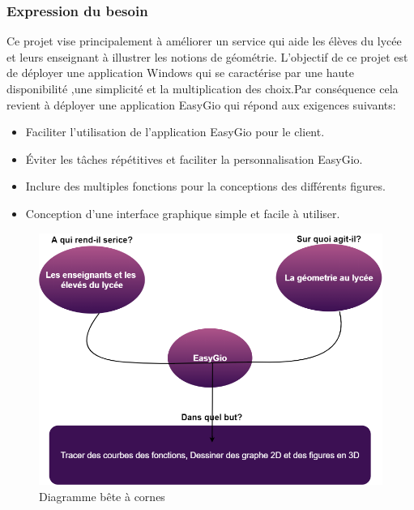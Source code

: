 \documentclass[a4paper]{report}
\begin{document}
\subsubsection{Expression du besoin}
Ce projet vise principalement à améliorer un service qui aide les élèves du lycée et leurs enseignant à illustrer les notions de géométrie. L’objectif de ce projet est de déployer une application Windows qui se caractérise par une haute disponibilité ,une simplicité et la multiplication des choix.Par conséquence cela revient à déployer une application EasyGio qui répond aux exigences suivants:
\begin{itemize}
    \item Faciliter l'utilisation de l'application EasyGio pour le client.
    \item Éviter les tâches répétitives et faciliter la personnalisation EasyGio.
    \item Inclure des multiples fonctions pour la conceptions des différents figures.
    \item Conception d'une interface graphique simple et facile à utiliser.
\end{itemize}
\begin{figure}[!h]
    \centering
    \includegraphics[width=14cm]{images/Expression du besoin.png}
    \caption{Diagramme bête à cornes}
    \label{fig:Diagramme bête à cornes}
\end{figure}
\end{document}
